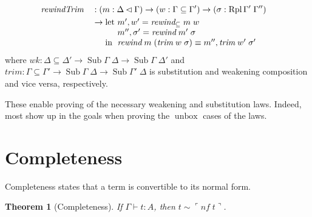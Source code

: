 \documentclass[12pt,twoside,openright]{report}
\numberwithin{equation}{chapter}
\numberwithin{figure}{chapter}
\numberwithin{table}{chapter}
\newtheorem{theorem}{Theorem}
\theoremstyle{definition}\newtheorem{definition}{Definition}
\DeclareMathOperator\unbox{unbox}
\begin{document}
\begin{itemize}
\begin{align*}
\begin{array}[t]{@{}l@{}l@{}}
    \end{array} \\
    &\textit{rewindTrim} &&: (m : \Delta\lhd\Gamma) \to (w : \Gamma \subseteq \Gamma') \to (\sigma : \operatorname{Rpl} \Gamma' \; \Gamma'') \\
    &&&\to
    \begin{array}[t]{@{}l@{}l@{}}
      \text{let } & m' , w' = \textit{rewind}_\subseteq \; m \; w \\
      & m'' , \sigma' = \textit{rewind} \; m' \; \sigma \\
      \text{in } & \textit{rewind} \; m \; (\textit{trim} \; w \; \sigma) \equiv m'' , \textit{trim} \; w' \; \sigma'
    \end{array}
  \end{align*}
  where $\textit{wk} : \Delta\subseteq\Delta' \to \operatorname{Sub} \Gamma \; \Delta \to \operatorname{Sub} \Gamma \; \Delta'$ and
  $\textit{trim} : \Gamma\subseteq\Gamma' \to \operatorname{Sub} \Gamma \; \Delta \to \operatorname{Sub} \Gamma' \; \Delta$
  is substitution and weakening composition and vice versa, respectively.
\end{itemize}
These enable proving of the necessary weakening and substitution laws.
Indeed, most show up in the goals when proving the $\unbox$ cases of the laws.

\section{Completeness}

Completeness states that a term is convertible to its normal form.
\begin{theorem}[Completeness]
  If $\Gamma \vdash t : A$, then $t \sim \ulcorner \textit{nf} \; t \urcorner$.
\end{theorem}
\end{document}
